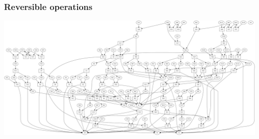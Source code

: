 \begin{frame}
  \frametitle{Reversible operations}
  \includegraphics[width=\textwidth]{../imgs/ssb_graph.pdf}
\end{frame}



